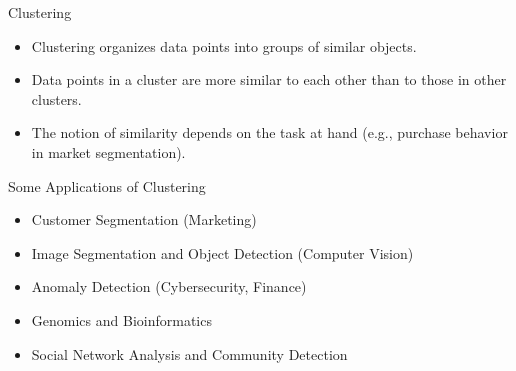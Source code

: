 \documentclass[serif, aspectratio=169]{beamer}
\begin{document}
\begin{frame}{Clustering}

        \begin{itemize}
        \item Clustering organizes data points into groups of similar objects.
\item Data points in a cluster are more similar to each other than to those in other clusters.
\item The notion of similarity depends on the task at hand (e.g., purchase behavior in market segmentation).
    \end{itemize}
\end{frame}

\begin{frame}{Some Applications of Clustering}
\begin{itemize}
    \item Customer Segmentation (Marketing)
    \item Image Segmentation and Object Detection (Computer Vision)
    \item Anomaly Detection (Cybersecurity, Finance)
    \item Genomics and Bioinformatics
    \item Social Network Analysis and Community Detection
\end{itemize}
\end{frame}
\end{document}
